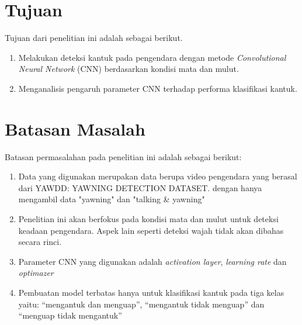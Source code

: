 \section{Tujuan}
Tujuan dari penelitian ini adalah sebagai berikut.

\begin{enumerate}

    \item Melakukan deteksi kantuk pada pengendara dengan metode \textit{Convolutional Neural Network} (CNN) berdasarkan kondisi mata dan mulut.
    
    \item Menganalisis pengaruh parameter CNN terhadap performa klasifikasi kantuk.

\end{enumerate}
\section{Batasan Masalah}
Batasan permasalahan pada penelitian ini adalah sebagai berikut:
\begin{enumerate}

    \item Data yang digunakan merupakan data berupa video pengendara 
    yang berasal dari YAWDD: YAWNING DETECTION DATASET. dengan hanya
    mengambil data "yawning" dan "talking & yawning"
    \item Penelitian ini akan berfokus pada kondisi mata dan mulut untuk deteksi keadaan pengendara. Aspek lain seperti deteksi wajah tidak akan dibahas secara rinci. 
    \item Parameter CNN yang digunakan adalah \textit{activation layer}, \textit{learning rate} dan \textit{optimazer}
    \item Pembuatan model terbatas hanya untuk klasifikasi kantuk pada tiga kelas yaitu: “mengantuk dan menguap”, “mengantuk tidak menguap” dan “menguap tidak mengantuk”

    

\end{enumerate}